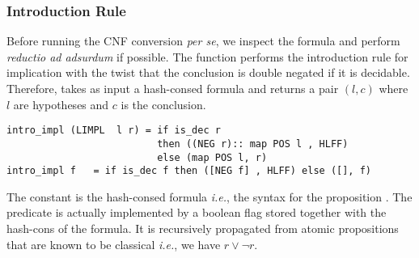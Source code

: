 \documentclass[utf8,a4paper,UKenglish,cleveref, autoref, thm-restate]{lipics-v2019}
\begin{document}
\subsubsection{Introduction Rule}
Before running the CNF conversion \emph{per se}, we inspect the
formula and perform \emph{reductio ad adsurdum} if possible. The
function  performs the introduction rule for
implication with the twist that the conclusion is double negated if it
is decidable. Therefore, 
takes as input a hash-consed formula and returns a pair
$(l,c)$ where $l$ are hypotheses and $c$ is the conclusion.
\begin{verbatim}
intro_impl (LIMPL  l r) = if is_dec r
                          then ((NEG r):: map POS l , HLFF)
                          else (map POS l, r)
intro_impl f   = if is_dec f then ([NEG f] , HLFF) else ([], f)
\end{verbatim}
The constant  is the hash-consed formula 
\emph{i.e.}, the syntax for the proposition .  The
 predicate is actually implemented by a boolean flag
stored together with the hash-cons of the formula. It is recursively
propagated from atomic propositions that are known to be classical
\emph{i.e.}, we have $r \lor \neg r$.
\end{document}
